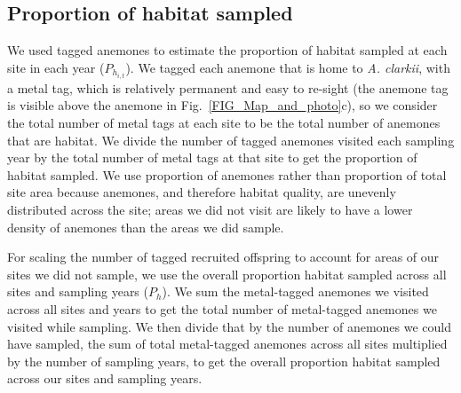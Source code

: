 \documentclass[12pt, oneside]{article}   	%
\begin{document}
\subsection{Proportion of habitat sampled} \label{APP_SEC_ProbHabSampled}

We used tagged anemones to estimate the proportion of habitat sampled at each site in each year ($P_{h_{i,t}}$). We tagged each anemone that is home to \textit{A. clarkii}, with a metal tag, which is relatively permanent and easy to re-sight (the anemone tag is visible above the anemone in Fig.\ \ref{FIG_Map_and_photo}c), so we consider the total number of metal tags at each site to be the total number of anemones that are habitat. We divide the number of tagged anemones visited each sampling year by the total number of metal tags at that site to get the proportion of habitat sampled. We use proportion of anemones rather than proportion of total site area because anemones, and therefore habitat quality, are unevenly distributed across the site; areas we did not visit are likely to have a lower density of anemones than the areas we did sample.

For scaling the number of tagged recruited offspring to account for areas of our sites we did not sample, we use the overall proportion habitat sampled across all sites and sampling years ($P_h$). We sum the metal-tagged anemones we visited across all sites and years to get the total number of metal-tagged anemones we visited while sampling. We then divide that by the number of anemones we could have sampled, the sum of total metal-tagged anemones across all sites multiplied by the number of sampling years, to get the overall proportion habitat sampled across our sites and sampling years.

\end{document}

